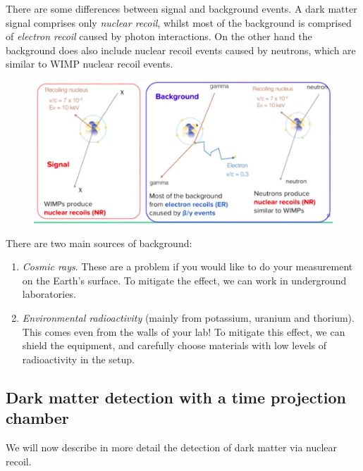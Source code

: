 \minirule

There are some differences between signal and background events. A dark matter signal comprises only \textit{nuclear recoil}, whilst most of the background is comprised of \textit{electron recoil} caused by photon interactions. On the other hand the background does also include nuclear recoil events caused by neutrons, which are similar to WIMP nuclear recoil events.

\begin{figure}[H]
\centering
\includegraphics[scale=0.4]{wimprecoil.png}
\end{figure}

There are two main sources of background: 
\begin{enumerate}[label = (\arabic*)]
\item \textit{Cosmic rays}. These are a problem if you would like to do your measurement on the Earth's surface. To mitigate the effect, we can work in underground laboratories.
\item \textit{Environmental radioactivity} (mainly from potassium, uranium and thorium). This comes even from the walls of your lab! To mitigate this effect, we can shield the equipment, and carefully choose materials with low levels of radioactivity in the setup.
\end{enumerate} 



\newpage
\subsection{Dark matter detection with a time projection chamber}
We will now describe in more detail the detection of dark matter via nuclear recoil.\\

